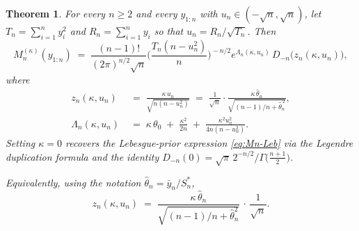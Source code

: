 \documentclass{article}%
\newtheorem{theorem}{Theorem}[section]
\begin{document}
\begin{theorem}\label{thm:Mn-kappa}
For every \(n\geq 2\) and every \(y_{1:n}\) with
\(u_n\in(-\sqrt n,\sqrt n)\), let
\(T_n=\sum_{i=1}^n y_i^2\) and \(R_n=\sum_{i=1}^n y_i\) so that
\(u_n=R_n/\sqrt{T_n}\). Then
\begin{equation}\label{eq:Mn-kappa}
  M_n^{(\kappa)}(y_{1:n})
  \;=\;\frac{(n-1)!}{(2\pi)^{n/2}\sqrt n}
       \biggl(\frac{T_n(n-u_n^2)}{n}\biggr)^{\!-n/2}
       e^{\Lambda_n(\kappa,u_n)}\,
       D_{-n}\!\bigl(z_n(\kappa,u_n)\bigr),
\end{equation}
where
\begin{align}
  z_n(\kappa,u_n) &\;=\;\frac{\kappa\,u_n}{\sqrt{n(n-u_n^2)}}
                       \;=\;\frac{1}{\sqrt n}\cdot
                       \frac{\kappa\,\widehat\theta_n}
                       {\sqrt{(n-1)/n+\widehat\theta_n^{\,2}}},
                       \label{eq:zn}\\[2pt]
  \Lambda_n(\kappa,u_n)
   &\;=\;\kappa\,\theta_0\;+\;\frac{\kappa^2}{2n}
        \;+\;\frac{\kappa^2 u_n^2}{4n(n-u_n^2)}.
        \label{eq:Lambdan}
\end{align}
Setting \(\kappa=0\) recovers the Lebesgue-prior expression
\eqref{eq:Mn-Leb} via the Legendre duplication formula and the
identity
\(D_{-n}(0)=\sqrt\pi\,2^{-n/2}/\Gamma\!\bigl(\tfrac{n+1}{2}\bigr)\). 

Equivalently, using the notation $\hat\theta_n = \bar y_n / S_n^*$,
\[
  z_n(\kappa, u_n) \;=\;
  \frac{\kappa\, \hat\theta_n}{\sqrt{(n-1)/n + \hat\theta_n^2}}\,
  \cdot\, \frac{1}{\sqrt n}.
\]
\end{theorem}
\end{document}

